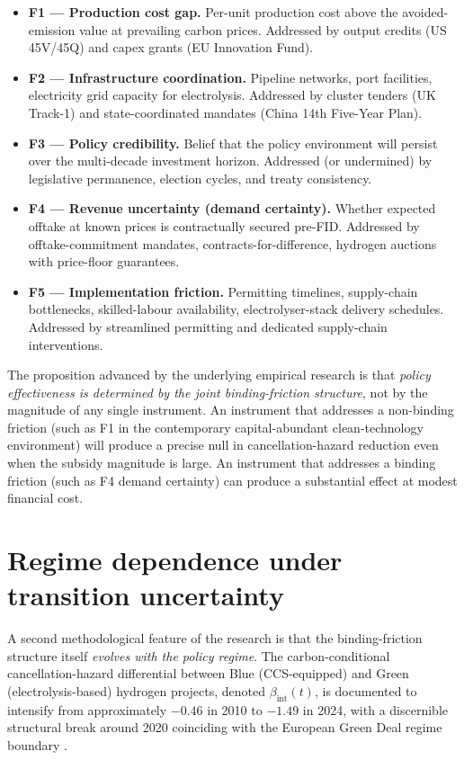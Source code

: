 \documentclass[11pt,a4paper]{article}
\newcommand{\bint}{\beta_{\text{int}}}
\begin{document}
\begin{itemize}
\item \textbf{F1 --- Production cost gap.} Per-unit production cost above the avoided-emission value at prevailing carbon prices. Addressed by output credits (US 45V/45Q) and capex grants (EU Innovation Fund).
\item \textbf{F2 --- Infrastructure coordination.} Pipeline networks, port facilities, electricity grid capacity for electrolysis. Addressed by cluster tenders (UK Track-1) and state-coordinated mandates (China 14th Five-Year Plan).
\item \textbf{F3 --- Policy credibility.} Belief that the policy environment will persist over the multi-decade investment horizon. Addressed (or undermined) by legislative permanence, election cycles, and treaty consistency.
\item \textbf{F4 --- Revenue uncertainty (demand certainty).} Whether expected offtake at known prices is contractually secured pre-FID. Addressed by offtake-commitment mandates, contracts-for-difference, hydrogen auctions with price-floor guarantees.
\item \textbf{F5 --- Implementation friction.} Permitting timelines, supply-chain bottlenecks, skilled-labour availability, electrolyser-stack delivery schedules. Addressed by streamlined permitting and dedicated supply-chain interventions.
\end{itemize}

The proposition advanced by the underlying empirical research is that \emph{policy effectiveness is determined by the joint binding-friction structure}, not by the magnitude of any single instrument. An instrument that addresses a non-binding friction (such as F1 in the contemporary capital-abundant clean-technology environment) will produce a precise null in cancellation-hazard reduction even when the subsidy magnitude is large. An instrument that addresses a binding friction (such as F4 demand certainty) can produce a substantial effect at modest financial cost.

\section{Regime dependence under transition uncertainty}

A second methodological feature of the research is that the binding-friction structure itself \emph{evolves with the policy regime}. The carbon-conditional cancellation-hazard differential between Blue (CCS-equipped) and Green (electrolysis-based) hydrogen projects, denoted $\bint(t)$, is documented to intensify from approximately $-0.46$ in 2010 to $-1.49$ in 2024, with a discernible structural break around 2020 coinciding with the European Green Deal regime boundary \cite{saakstra2026paper1, saakstra2026thesis}.
\end{document}
